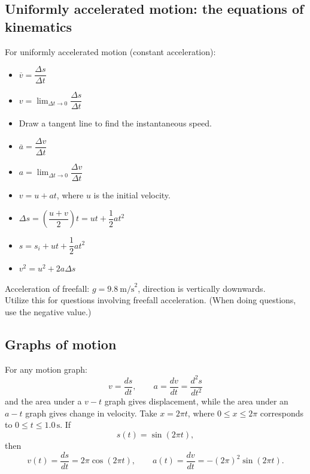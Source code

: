 \documentclass[a4paper,12pt]{article}
\begin{document}
\subsection{Uniformly accelerated motion: the equations of kinematics}
For uniformly accelerated motion (constant acceleration):
\begin{itemize}
  \item $\overline{v}=\dfrac{\Delta s}{\Delta t}$
  \item $\displaystyle v=\lim_{\Delta t \to 0}\dfrac{\Delta s}{\Delta t}$
  \item Draw a tangent line to find the instantaneous speed.
  \item $\overline{a}=\dfrac{\Delta v}{\Delta t}$
  \item $\displaystyle a=\lim_{\Delta t \to 0}\dfrac{\Delta v}{\Delta t}$
  \item $v=u+at$, where $u$ is the initial velocity.
  \item $\Delta s=\left(\dfrac{u+v}{2}\right)t=ut+\dfrac{1}{2}at^2$
  \item $s=s_i+ut+\dfrac{1}{2}at^2$
  \item $v^2=u^2+2a\Delta s$
\end{itemize}
Acceleration of freefall: $g=9.8\ \text{m/s}^2$, direction is vertically downwards.\\
Utilize this for questions involving freefall acceleration. (When doing questions, use the negative value.)
\subsection{Graphs of motion}
For any motion graph:
\[
  v=\frac{ds}{dt},\qquad a=\frac{dv}{dt}=\frac{d^2s}{dt^2}
\]
and the area under a $v-t$ graph gives displacement, while the area under
an $a-t$ graph gives change in velocity. Take $x=2\pi t$, where $0\leq x\leq 2\pi$ corresponds to
$0\leq t\leq 1.0\,\mathrm{s}$. If
\[
  s(t)=\sin(2\pi t),
\]
then
\[
  v(t)=\frac{ds}{dt}=2\pi\cos(2\pi t),\qquad
  a(t)=\frac{dv}{dt}=-(2\pi)^2\sin(2\pi t).
\]
\end{document}
